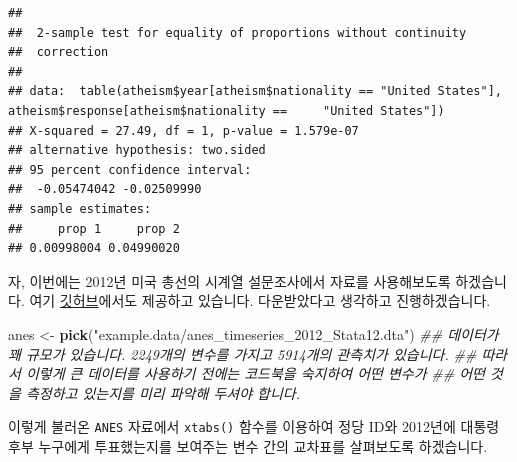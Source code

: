 \documentclass[]{book}
\newenvironment{Shaded}{\begin{snugshade}}{\end{snugshade}}
\newcommand{\CommentTok}[1]{\textcolor[rgb]{0.56,0.35,0.01}{\textit{#1}}}
\newcommand{\DataTypeTok}[1]{\textcolor[rgb]{0.13,0.29,0.53}{#1}}
\newcommand{\KeywordTok}[1]{\textcolor[rgb]{0.13,0.29,0.53}{\textbf{#1}}}
\newcommand{\NormalTok}[1]{#1}
\newcommand{\OperatorTok}[1]{\textcolor[rgb]{0.81,0.36,0.00}{\textbf{#1}}}
\newcommand{\OtherTok}[1]{\textcolor[rgb]{0.56,0.35,0.01}{#1}}
\newcommand{\StringTok}[1]{\textcolor[rgb]{0.31,0.60,0.02}{#1}}
\begin{document}
\begin{Shaded}
\end{Shaded}

\begin{verbatim}
## 
##  2-sample test for equality of proportions without continuity
##  correction
## 
## data:  table(atheism$year[atheism$nationality == "United States"], atheism$response[atheism$nationality ==     "United States"])
## X-squared = 27.49, df = 1, p-value = 1.579e-07
## alternative hypothesis: two.sided
## 95 percent confidence interval:
##  -0.05474042 -0.02509990
## sample estimates:
##     prop 1     prop 2 
## 0.00998004 0.04990020
\end{verbatim}

자, 이번에는 2012년 미국 총선의 시계열 설문조사에서 자료를 사용해보도록 하겠습니다. 여기 \href{https://github.com/jhomola/PS5/blob/master/anes_timeseries_2012_stata12.dta}{깃허브}에서도 제공하고 있습니다. 다운받았다고 생각하고 진행하겠습니다.

\begin{Shaded}
\begin{Highlighting}[]
\NormalTok{anes <-}\StringTok{ }\KeywordTok{pick}\NormalTok{(}\StringTok{"example.data/anes_timeseries_2012_Stata12.dta"}\NormalTok{)}
\CommentTok{## 데이터가 꽤 규모가 있습니다. 2249개의 변수를 가지고 5914개의 관측치가 있습니다.}
\CommentTok{## 따라서 이렇게 큰 데이터를 사용하기 전에는 코드북을 숙지하여 어떤 변수가}
\CommentTok{## 어떤 것을 측정하고 있는지를 미리 파악해 두셔야 합니다.}
\end{Highlighting}
\end{Shaded}

이렇게 불러온 \texttt{ANES} 자료에서 \texttt{xtabs()} 함수를 이용하여 정당 ID와 2012년에 대통령 후부 누구에게 투표했는지를 보여주는 변수 간의 교차표를 살펴보도록 하겠습니다.
\end{document}
